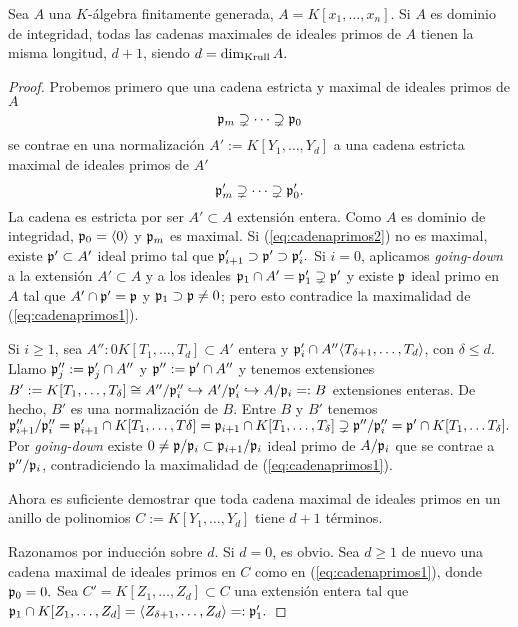 \documentclass[../main.tex]{subfiles}
\begin{document}
\begin{theorem}
	Sea $A$ una $K$-álgebra finitamente generada, $A=K[x_1,\dots, x_n]$. Si $A$ es dominio de integridad, todas las cadenas maximales de ideales primos de $A$ tienen la misma longitud, $d+1$, siendo $d=\dim_{\text{Krull}} A.$
\end{theorem}

\begin{proof}
	Probemos primero que una cadena estricta y maximal de ideales primos de $A$
	\begin{equation}\label{eq:cadenaprimos1}
	\mathfrak{p}_m\supsetneq\cdots\supsetneq\mathfrak{p}_0
	\end{equation}
	se contrae en una normalización $A':=K[Y_1,\dots,Y_d]$ a una cadena estricta maximal de ideales primos de $A'$
	\begin{equation}\label{eq:cadenaprimos2}
	\mathfrak{p}_m'\supsetneq\cdots\supsetneq\mathfrak{p}_0'.
	\end{equation}
	La cadena es estricta por ser $A'\subset A$ extensión entera. Como $A$ es dominio de integridad, $\mathfrak{p}_0=\langle 0\rangle$ y $\mathfrak{p}_m$ es maximal. Si (\ref{eq:cadenaprimos2}) no es maximal, existe $\mathfrak{p}'\subset A'$ ideal primo tal que $\mathfrak{p}_{i+1}'\supset\mathfrak{p}'\supset\mathfrak{p}_i'.$ Si $i=0$, aplicamos \textit{going-down} a la extensión $A'\subset A$ y a los ideales $\mathfrak{p}_1\cap A'=\mathfrak{p}_1'\supsetneq \mathfrak{p}'$ y existe $\mathfrak{p}$ ideal primo en $A$ tal que $A'\cap\mathfrak{p}'=\mathfrak{p}$ y $\mathfrak{p}_1\supset\mathfrak{p}\neq 0$; pero esto contradice la maximalidad de (\ref{eq:cadenaprimos1}).
	
	Si $i\ge 1$, sea $A'':0K[T_1,\dots, T_d]\subset A'$ entera y $\mathfrak{p}_i'\cap A''\langle T_{\delta+1},\dots, T_d\rangle$, con $\delta\le d.$ Llamo $\mathfrak{p}_j'':=\mathfrak{p}_j'\cap A''$ y $\mathfrak{p}'':=\mathfrak{p}'\cap A''$ y tenemos extensiones $B':=K[T_1,\dots,T_\delta]\cong A''/\mathfrak{p}_i''\hookrightarrow A'/\mathfrak{p}_i'\hookrightarrow A/\mathfrak{p}_i=:B$ extensiones enteras. De hecho, $B'$ es una normalización de $B.$ Entre $B$ y $B'$ tenemos $\mathfrak{p}_{i+1}''/\mathfrak{p}_i''=\mathfrak{p}_{i+1}'\cap K[T_1,\dots,T\delta]=\mathfrak{p}_{i+1}\cap K[T_1,\dots, T_\delta]\supsetneq \mathfrak{p}''/\mathfrak{p}_i''=\mathfrak{p}'\cap K[T_1,\dots T_\delta].$ Por \textit{going-down} existe $0\neq \mathfrak{p}/\mathfrak{p}_i\subset\mathfrak{p}_{i+1}/\mathfrak{p}_i$ ideal primo de $A/\mathfrak{p}_i$ que se contrae a $\mathfrak{p}''/\mathfrak{p}_i$, contradiciendo la maximalidad de (\ref{eq:cadenaprimos1}).
	
	Ahora es suficiente demostrar que toda cadena maximal de ideales primos en un anillo de polinomios $C:=K[Y_1,\dots,Y_d]$ tiene $d+1$ términos.
	
	Razonamos por inducción sobre $d.$ Si $d=0$, es obvio. Sea $d\ge 1$ de nuevo una cadena maximal de ideales primos en $C$ como en (\ref{eq:cadenaprimos1}), donde $\mathfrak{p}_0=0.$ Sea $C'=K[Z_1,\dots,Z_d]\subset C$ una extensión entera tal que $\mathfrak{p}_1\cap K[Z_1,\dots, Z_d]=\langle Z_{\delta+1},\dots, Z_d\rangle=:\mathfrak{p}_1'.$
	

\end{proof}
\end{document}
